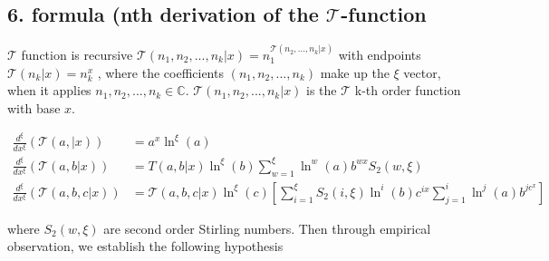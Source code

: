 \subsection{6. formula (nth derivation of the \(\mathcal{T}\)-function}

\begin{definition}
        \(\mathcal{T}\) function is recursive \(\mathcal{T}(n_1,
        n_2, ..., n_k | x) = n_1^{\mathcal{T}(n_2, ..., n_k | x)}\)
        with endpoints \(\mathcal{T}(n_k | x ) = n_k^x\) , 
        where the coefficients  \((n_1, n_2, ..., n_k)\) make up
        the \(\xi\) vector,
        when it applies \(n_1, n_2, ..., n_k \in  \mathbb{C}\). 
        \(\mathcal{T}(n_1, n_2, ..., n_k | x) \) is the 
        \(\mathcal{T}\) k-th order function with base \(x\).
\end{definition}

\begin{align}
        \frac{d^\xi}{dx^\xi}(\mathcal{T}(a,| x) ) &=a^x
        \ln^\xi(a)\\
        \frac{d^\xi}{dx^\xi}(\mathcal{T}(a, b | x) ) &=
        T(a, b |x) \ln^\xi(b) \sum_{w=1}^\xi \ln^w(a)
        b^{wx} S_2(w, \xi) \\
        \frac{d^\xi}{dx^\xi}(\mathcal{T}(a, b, c | x) 
        ) &= \mathcal{T}(a, b, c | x) \ln^\xi(c) \left[
        \sum_{i=1}^\xi S_2(i, \xi) \ln^i(b)c^{ix} 
        \sum_{j=1}^i \ln^j(a) b^{jc^x}\right]
\end{align}

where \(S_2(w, \xi)\) are second order Stirling 
numbers. Then through empirical observation, we 
establish the following hypothesis


